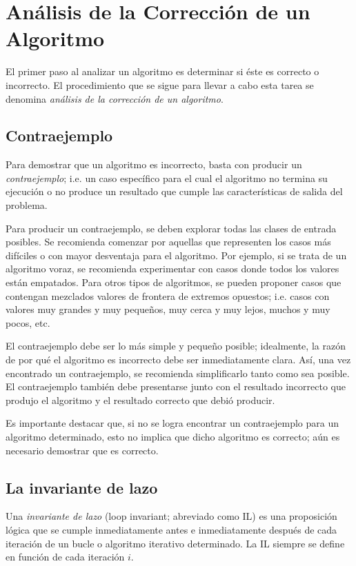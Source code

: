 \chapter{Análisis de la Corrección de un Algoritmo}

El primer paso al analizar un algoritmo es determinar si éste es correcto
o incorrecto. El procedimiento que se sigue para llevar a cabo esta
tarea se denomina \emph{análisis de la corrección de un algoritmo}.

\section{Contraejemplo}

Para demostrar que un algoritmo es incorrecto, basta con producir
un \emph{contraejemplo}; i.e. un caso específico para el cual el algoritmo
no termina su ejecución o no produce un resultado que cumple las características
de salida del problema. 

Para producir un contraejemplo, se deben explorar todas las clases
de entrada posibles. Se recomienda comenzar por aquellas que representen
los casos más difíciles o con mayor desventaja para el algoritmo. Por ejemplo, si
se trata de un algoritmo voraz, se recomienda experimentar con casos donde todos
los valores están empatados. Para otros tipos de algoritmos, se pueden
proponer casos que contengan mezclados valores de frontera de extremos
opuestos; i.e. casos con valores muy grandes y muy pequeños,
muy cerca y muy lejos, muchos y muy pocos, etc.

El contraejemplo debe ser lo más simple y pequeño posible; idealmente,
la razón de por qué el algoritmo es incorrecto debe ser inmediatamente
clara. Así, una vez encontrado un contraejemplo, se recomienda simplificarlo
tanto como sea posible. El contraejemplo también debe presentarse
junto con el resultado incorrecto que produjo el algoritmo y el resultado
correcto que debió producir.

Es importante destacar que, si no se logra encontrar un contraejemplo
para un algoritmo determinado, esto no implica que dicho algoritmo
es correcto; aún es necesario demostrar que es correcto.

\section{La invariante de lazo}

Una \emph{invariante de lazo} (loop invariant; abreviado como IL) es una proposición
lógica que se cumple inmediatamente antes e inmediatamente después
de cada iteración de un bucle o algoritmo iterativo determinado. La
IL siempre se define en función de cada iteración $i$.

